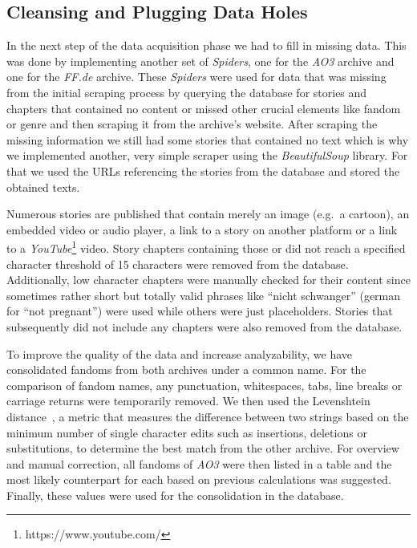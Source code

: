 \subsection{Cleansing and Plugging Data Holes}\label{subsec:cleansing-data}
In the next step of the data acquisition phase we had to fill in missing data.
This was done by implementing another set of \emph{Spiders}, one for the \emph{AO3} archive and one for the \emph{FF.de} archive.
These \emph{Spiders} were used for data that was missing from the initial scraping process by querying the database for stories and chapters that contained no content or missed other crucial elements like fandom or genre and then scraping it from the archive's website.
After scraping the missing information we still had some stories that contained no text which is why we implemented another, very simple scraper using the \emph{BeautifulSoup} library.
For that we used the URLs referencing the stories from the database and stored the obtained texts.

Numerous stories are published that contain merely an image (e.g.~a cartoon), an embedded video or audio player, a link to a story on another platform or a link to a \emph{YouTube}\footnote{https://www.youtube.com/} video.
Story chapters containing those or did not reach a specified character threshold of 15 characters were removed from the database.
Additionally, low character chapters were manually checked for their content since sometimes rather short but totally valid phrases like ``nicht schwanger'' (german for ``not pregnant'') were used while others were just placeholders.
Stories that subsequently did not include any chapters were also removed from the database.

To improve the quality of the data and increase analyzability, we have consolidated fandoms from both archives under a common name.
For the comparison of fandom names, any punctuation, whitespaces, tabs, line breaks or carriage returns were temporarily removed.
We then used the Levenshtein distance~\citep{Levenshtein1966BinaryReversals}, a metric that measures the difference between two strings based on the minimum number of single character edits such as insertions, deletions or substitutions, to determine the best match from the other archive.
For overview and manual correction, all fandoms of \emph{AO3} were then listed in a table and the most likely counterpart for each based on previous calculations was suggested.
Finally, these values were used for the consolidation in the database.

